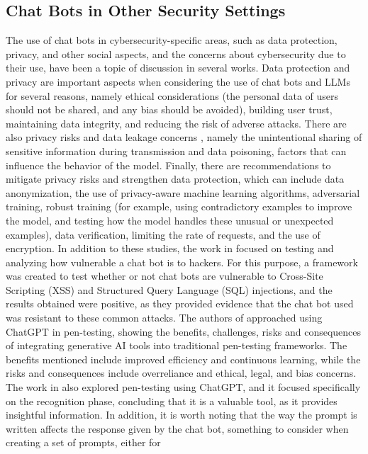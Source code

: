 \documentclass[sigconf]{acmart}
\begin{document}
\subsection{Chat Bots in Other Security Settings}
The use of chat bots in cybersecurity-specific areas, such as data
protection, privacy, and other social aspects, and the concerns about
cybersecurity due to their use, have been a topic of discussion in
several works. Data protection and privacy are important aspects
when considering the use of chat bots and LLMs \cite{Sebastian23} for several
reasons, namely ethical considerations (the personal data of users
should not be shared, and any bias should be avoided), building user
trust, maintaining data integrity, and reducing the risk of adverse
attacks.
There are also privacy risks and data leakage concerns \cite{Hasal21}, namely
the unintentional sharing of sensitive information during transmission and data poisoning, factors that can influence the behavior
of the model. Finally, there are recommendations to mitigate privacy risks and strengthen data protection, which can include data
anonymization, the use of privacy-aware machine learning algorithms, adversarial training, robust training (for example, using
contradictory examples to improve the model, and testing how
the model handles these unusual or unexpected examples), data verification, limiting the rate of requests, and the use of encryption.
In addition to these studies, the work in \cite{Bozic18} focused on testing
and analyzing how vulnerable a chat bot is to hackers. For this
purpose, a framework was created to test whether or not chat bots
are vulnerable to Cross-Site Scripting (XSS) and Structured Query
Language (SQL) injections, and the results obtained were positive,
as they provided evidence that the chat bot used was resistant to
these common attacks.
The authors of \cite{Hilario24} approached using ChatGPT in pen-testing,
showing the benefits, challenges, risks and consequences of integrating generative AI tools into traditional pen-testing frameworks.
The benefits mentioned include improved efficiency and continuous
learning, while the risks and consequences include overreliance
and ethical, legal, and bias concerns. The work in \cite{Temara23} also explored
pen-testing using ChatGPT, and it focused specifically on the recognition phase, concluding that it is a valuable tool, as it provides
insightful information. In addition, it is worth noting that the way
the prompt is written affects the response given by the chat bot,
something to consider when creating a set of prompts, either for
\end{document}
